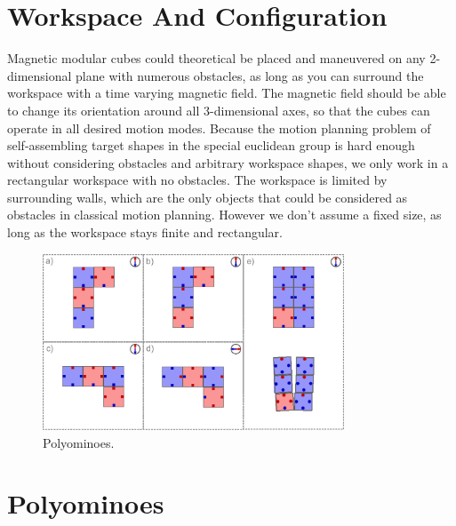 \section{Workspace And Configuration}
Magnetic modular cubes could theoretical be placed and maneuvered on any 2-dimensional plane with numerous obstacles, as long as you can surround the workspace with a time varying magnetic field.
The magnetic field should be able to change its orientation around all 3-dimensional axes, so that the cubes can operate in all desired motion modes.
Because the motion planning problem of self-assembling target shapes in the special euclidean group is hard enough without considering obstacles and arbitrary workspace shapes, we only work in a rectangular workspace with no obstacles.
The workspace is limited by surrounding walls, which are the only objects that could be considered as obstacles in classical motion planning.
However we don't assume a fixed size, as long as the workspace stays finite and rectangular.


\begin{figure}
	\centering
	\includegraphics[width=0.80\textwidth]{figures/polyominoes.pdf}
	\caption{Polyominoes.}
	\label{fig:polyominoes}
\end{figure}

\section{Polyominoes}



